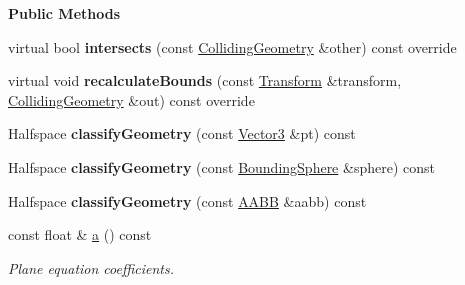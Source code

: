 \begin{Indent}\textbf{ Public Methods}\par
\begin{DoxyCompactItemize}
\item 
\mbox{\label{classrev_1_1_bounding_plane_a662a93591a157a6c3b50ae77be83ae3c}} 
virtual bool {\bfseries intersects} (const \mbox{\hyperlink{classrev_1_1_colliding_geometry}{Colliding\+Geometry}} \&other) const override
\item 
\mbox{\label{classrev_1_1_bounding_plane_a3c9feaa524f32f3e999f32097dce04e4}} 
virtual void {\bfseries recalculate\+Bounds} (const \mbox{\hyperlink{classrev_1_1_transform}{Transform}} \&transform, \mbox{\hyperlink{classrev_1_1_colliding_geometry}{Colliding\+Geometry}} \&out) const override
\item 
\mbox{\label{classrev_1_1_bounding_plane_a20969df48ec021296720036d86707367}} 
Halfspace {\bfseries classify\+Geometry} (const \mbox{\hyperlink{classrev_1_1_vector}{Vector3}} \&pt) const
\item 
\mbox{\label{classrev_1_1_bounding_plane_a504dd29f3e626a3f5e85da895b793d95}} 
Halfspace {\bfseries classify\+Geometry} (const \mbox{\hyperlink{classrev_1_1_bounding_sphere}{Bounding\+Sphere}} \&sphere) const
\item 
\mbox{\label{classrev_1_1_bounding_plane_a80b06a2891c2904d381192260ddf70ea}} 
Halfspace {\bfseries classify\+Geometry} (const \mbox{\hyperlink{classrev_1_1_a_a_b_b}{A\+A\+BB}} \&aabb) const
\item 
\mbox{\label{classrev_1_1_bounding_plane_a9fe6865adc6e641264a8e64c82f3a01d}} 
const float \& \mbox{\hyperlink{classrev_1_1_bounding_plane_a9fe6865adc6e641264a8e64c82f3a01d}{a}} () const
\begin{DoxyCompactList}\small\item\em Plane equation coefficients. \end{DoxyCompactList}\item 
\mbox{\label{classrev_1_1_bounding_plane_a9119b7b663fe9705c15b1ad48a11a391}} 

\end{DoxyCompactItemize}
\end{Indent}
